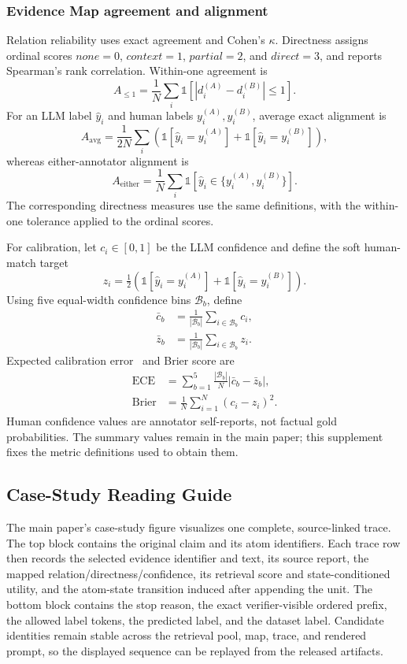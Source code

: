 \subsubsection{Evidence Map agreement and alignment}

Relation reliability uses exact agreement and Cohen's \(\kappa\).
Directness assigns ordinal scores
\(\textit{none}=0\), \(\textit{context}=1\),
\(\textit{partial}=2\), and \(\textit{direct}=3\), and reports Spearman's
rank correlation.  Within-one agreement is
\[
A_{\leq1}=\frac{1}{N}\sum_i
\mathbb{1}\!\left[|d_i^{(A)}-d_i^{(B)}|\leq1\right].
\]
For an LLM label \(\hat y_i\) and human labels
\(y_i^{(A)},y_i^{(B)}\), average exact alignment is
\[
A_{\mathrm{avg}}=
\frac{1}{2N}\sum_i
\left(\mathbb{1}[\hat y_i=y_i^{(A)}]
+      \mathbb{1}[\hat y_i=y_i^{(B)}]\right),
\]
whereas either-annotator alignment is
\[
A_{\mathrm{either}}=
\frac{1}{N}\sum_i
\mathbb{1}[\hat y_i\in\{y_i^{(A)},y_i^{(B)}\}].
\]
The corresponding directness measures use the same definitions, with the
within-one tolerance applied to the ordinal scores.

For calibration, let \(c_i\in[0,1]\) be the LLM confidence and define the
soft human-match target
\[
z_i=\tfrac12\left(
\mathbb{1}[\hat y_i=y_i^{(A)}]
+\mathbb{1}[\hat y_i=y_i^{(B)}]\right).
\]
Using five equal-width confidence bins \(\mathcal B_b\), define
\[
\begin{aligned}
\bar c_b&=\frac{1}{|\mathcal B_b|}
\sum_{i\in\mathcal B_b}c_i,\\
\bar z_b&=\frac{1}{|\mathcal B_b|}
\sum_{i\in\mathcal B_b}z_i.
\end{aligned}
\]
Expected calibration error~\citep{Guo2017Calibration} and Brier score are
\begin{align}
\mathrm{ECE}
&=\sum_{b=1}^{5}\frac{|\mathcal B_b|}{N}
\left|\bar c_b-\bar z_b\right|,\\
\mathrm{Brier}
&=\frac{1}{N}\sum_{i=1}^{N}(c_i-z_i)^2.
\end{align}
Human confidence values are annotator self-reports, not factual gold
probabilities.  The summary values remain in the main paper; this supplement
fixes the metric definitions used to obtain them.

\subsection{Case-Study Reading Guide}
\label{sec:supp-case}

The main paper's case-study figure visualizes one complete, source-linked
trace.
The top block contains the original claim and its atom identifiers.  Each
trace row then records the selected evidence identifier and text, its
source report, the mapped relation/directness/confidence, its retrieval
score and state-conditioned utility, and the atom-state transition induced
after appending the unit.  The bottom block contains the stop reason, the
exact verifier-visible ordered prefix, the allowed label tokens, the
predicted label, and the dataset label.  Candidate identities remain stable
across the retrieval pool, map, trace, and rendered prompt, so the displayed
sequence can be replayed from the released artifacts.

